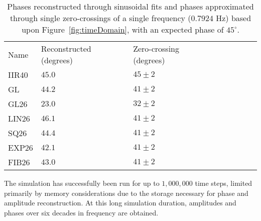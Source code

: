 \begin{table}
\begin{tabular}{llllllll}
\hline
Name &Reconstructed (degrees) &Zero-crossing (degrees)\\ IIR40 &$45.0$
&$45\pm 2$\\ GL &$44.2$ &$41\pm 2$\\ GL26 &$23.0$ &$32\pm 2$\\ LIN26
&$46.1$ &$41\pm 2$\\ SQ26 &$44.4$ &$41\pm 2$\\ EXP26 &$42.1$ &$41\pm
2$\\ FIB26 &$43.0$ &$41\pm 2$\\
\hline
\end{tabular}
\caption{Phases reconstructed through sinusoidal fits and phases approximated through single zero-crossings of a single frequency ($0.7924$ Hz) based upon Figure~\ref{fig:timeDomain}, with an expected phase of $45^\circ$.}
\label{tab:phaseRecon}
\end{table}

The simulation has successfully been run for up to $1,000,000$ time
steps, limited primarily by memory considerations due to the storage
necessary for phase and amplitude reconstruction. At this long
simulation duration, amplitudes and phases over six decades in
frequency are obtained.
